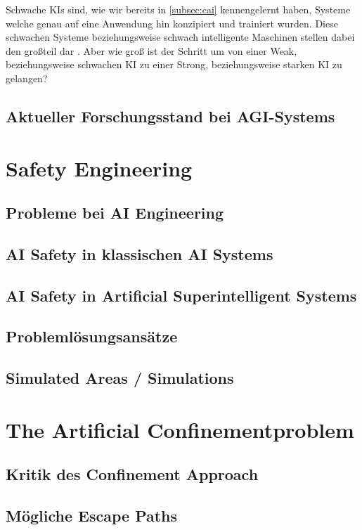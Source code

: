     Schwache KIs sind, wie wir bereits in \ref{subsec:cai} kennengelernt haben, Systeme welche genau auf
    eine Anwendung hin konzipiert und trainiert wurden. Diese schwachen Systeme beziehungsweise schwach
    intelligente Maschinen stellen dabei den großteil dar . Aber wie groß ist der
    Schritt um von einer Weak, beziehungsweise schwachen KI zu einer Strong, beziehungsweise starken KI
    zu gelangen?


    \subsection{Aktueller Forschungsstand bei AGI-Systems}
    
\section{Safety Engineering}
    \subsection{Probleme bei AI Engineering}
    \subsection{AI Safety in klassischen AI Systems}
    \subsection{AI Safety in Artificial Superintelligent Systems}

    \subsection{Problemlösungsansätze} 
    \subsection{Simulated Areas / Simulations}
\section{The Artificial Confinementproblem}
    \subsection{Kritik des Confinement Approach}
    \subsection{Mögliche Escape Paths}
